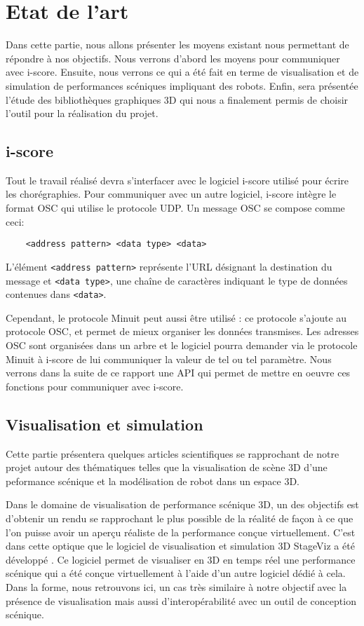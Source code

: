 \section{Etat de l'art}

Dans cette partie, nous allons présenter les moyens existant nous permettant de répondre à nos objectifs. Nous verrons d'abord les moyens pour communiquer avec i-score. Ensuite, nous verrons ce qui a été fait en terme de visualisation et de simulation de performances scéniques impliquant des robots. Enfin, sera présentée l'étude des bibliothèques graphiques 3D qui nous a finalement permis de choisir l'outil pour la réalisation du projet.

\subsection{i-score}

Tout le travail réalisé devra s'interfacer avec le logiciel i-score utilisé pour écrire les chorégraphies. Pour communiquer avec un autre logiciel, i-score intègre le format OSC qui utilise le protocole UDP. Un message OSC se compose comme ceci:
\begin{lstlisting}
	<address pattern> <data type> <data>
\end{lstlisting}

L'élément \verb|<address pattern>| représente l'URL désignant la destination du message et \verb|<data type>|, une chaîne de caractères indiquant le type de données contenues dans \verb|<data>|.

Cependant, le protocole Minuit peut aussi être utilisé : ce protocole s'ajoute au protocole OSC, et permet de mieux organiser les données transmises. Les adresses OSC sont organisées dans un arbre et le logiciel pourra demander via le protocole Minuit à i-score de lui communiquer la valeur de tel ou tel paramètre. Nous verrons dans la suite de ce rapport une API qui permet de mettre en oeuvre ces fonctions pour communiquer avec i-score.

\subsection{Visualisation et simulation}

Cette partie présentera quelques articles scientifiques se rapprochant de notre projet autour des thématiques telles que la visualisation de scène 3D d'une peformance scénique et la modélisation de robot dans un espace 3D. 

Dans le domaine de visualisation de performance scénique 3D, un des objectifs est d'obtenir un rendu se rapprochant le plus possible de la réalité de façon à ce que l'on puisse avoir un aperçu réaliste de la performance conçue virtuellement. C'est dans cette optique que le logiciel de visualisation et simulation 3D StageViz\cite{StageViz} a été développé . Ce logiciel permet de visualiser en 3D en temps réel une performance scénique qui a été conçue virtuellement à l'aide d'un autre logiciel dédié à cela. Dans la forme, nous retrouvons ici, un cas très similaire à notre objectif avec la présence de visualisation mais aussi d'interopérabilité avec un outil de conception scénique.

